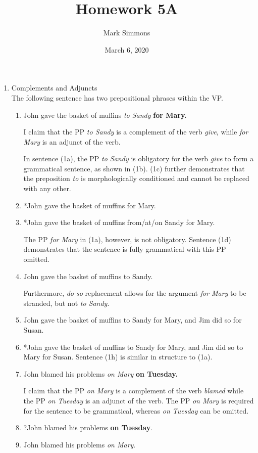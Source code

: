 \documentclass[12pt]{article}
\title{Homework 5A}
\author{Mark Simmons}
\date{March 6, 2020}
\begin{document}
\maketitle

\begin{enumerate}

\item Complements and Adjuncts\\
The following sentence has two prepositional phrases within the VP.
\begin{enumerate}
\item John gave the basket of muffins \emph{to Sandy} {\bf{for Mary}.}

I claim that the PP \emph{to Sandy} is a complement of the verb \emph{give}, while \emph{for Mary} is an adjunct of the verb.

In sentence (1a), the PP \emph{to Sandy} is obligatory for the verb \emph{give} to form a grammatical sentence, as shown in (1b). (1c) further demonstrates that the preposition \emph{to} is morphologically conditioned and cannot be replaced with any other.
\item *John gave the basket of muffins for Mary.
\item *John gave the basket of muffins from/at/on Sandy for Mary.

The PP \emph{for Mary} in (1a), however, is not obligatory. Sentence (1d) demonstrates that the sentence is fully grammatical with this PP omitted.
\item John gave the basket of muffins to Sandy.

Furthermore, \emph{do-so} replacement allows for the argument \emph{for Mary} to be stranded, but not \emph{to Sandy}.
\item John gave the basket of muffins to Sandy for Mary, and Jim did so for Susan.
\item *John gave the basket of muffins to Sandy for Mary, and Jim did so to Mary for Susan.
Sentence (1h) is similar in structure to (1a).
\item John blamed his problems \emph{on Mary} \bf{on Tuesday.}

I claim that the PP \emph{on Mary} is a complement of the verb \emph{blamed} while the PP \emph{on Tuesday} is an adjunct of the verb.
The PP \emph{on Mary} is required for the sentence to be grammatical, whereas \emph{on Tuesday} can be omitted.
\item ?John blamed his problems {\bf{on Tuesday}}.
\item John blamed his problems \emph{on Mary}.


\end{enumerate}
\end{enumerate}
\end{document}
